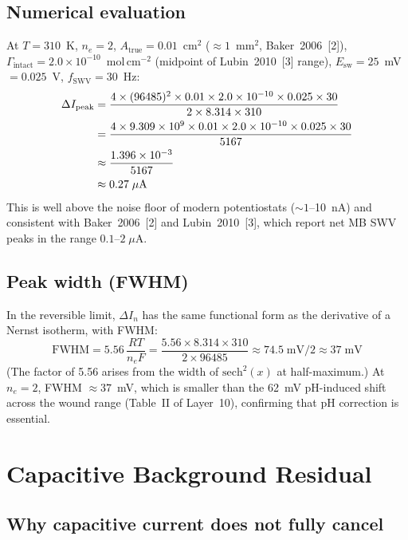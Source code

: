 \documentclass[10pt,a4paper]{article}
\numberwithin{equation}{section}
\newcommand{\cit}[1]{[#1]}
\newcommand{\Gtot}{\Gamma_{\text{intact}}}
\newcommand{\DI}{\Delta I}
\newcommand{\Esw}{E_{\text{sw}}}
\begin{document}
\subsection{Numerical evaluation}

At $T = 310$~K, $n_e = 2$, $A_{\text{true}} = 0.01$~cm$^2$
($\approx 1$~mm$^2$, Baker~2006~\cit{2}),
$\Gtot = 2.0\times10^{-10}$~mol\,cm$^{-2}$ (midpoint of Lubin~2010~\cit{3}
range), $\Esw = 25$~mV $= 0.025$~V, $f_{\text{SWV}} = 30$~Hz:
\begin{align}
  \DI_{\text{peak}} &= \frac{4 \times (96485)^2 \times 0.01 \times
    2.0\times10^{-10} \times 0.025 \times 30}{2 \times 8.314 \times 310}
  \label{eq:DIpeak_num}\\
  &= \frac{4 \times 9.309\times10^9 \times 0.01 \times
    2.0\times10^{-10} \times 0.025 \times 30}{5167}\notag\\
  &\approx \frac{1.396\times10^{-3}}{5167}\notag\\
  &\approx 0.27\;\mu\text{A}
  \label{eq:DIpeak_val}
\end{align}
This is well above the noise floor of modern potentiostats
($\sim 1$--10~nA) and consistent with Baker~2006~\cit{2} and
Lubin~2010~\cit{3}, which report net MB SWV peaks in the range
$0.1$--$2\;\mu$A.

\subsection{Peak width (FWHM)}

In the reversible limit, $\DI_n$ has the same functional form as
the derivative of a Nernst isotherm, with FWHM:
\begin{equation}
  \text{FWHM} = 5.56\,\frac{RT}{n_e F}
  = \frac{5.56 \times 8.314 \times 310}{2 \times 96485}
  \approx 74.5\;\text{mV} / 2
  \approx 37\;\text{mV}
  \label{eq:FWHM}
\end{equation}
(The factor of 5.56 arises from the width of $\text{sech}^2(x)$ at
half-maximum.) At $n_e = 2$, FWHM $\approx 37$~mV, which is smaller
than the 62~mV pH-induced shift across the wound range (Table~II of
Layer~10), confirming that pH correction is essential.

\section{Capacitive Background Residual}
\label{sec:cap}

\subsection{Why capacitive current does not fully cancel}
\end{document}
